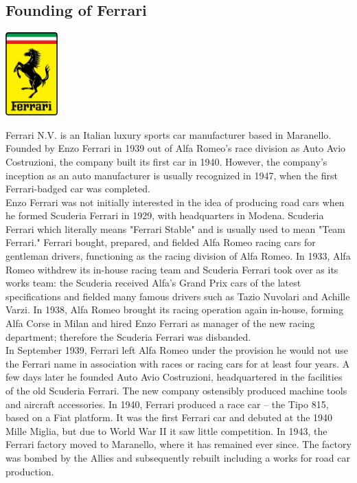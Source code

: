 \documentclass[11pt]{report}
\begin{document}
\subsection{Founding of Ferrari}
\vspace{2mm}\begin{center}\includegraphics[width=2cm]{./img/ferrariLogo.jpg}\end{center}
Ferrari N.V. is an Italian luxury sports car manufacturer based in Maranello. Founded by Enzo Ferrari in 1939 out of Alfa Romeo's race division as Auto Avio Costruzioni, the company built its first car in 1940. However, the company's inception as an auto manufacturer is usually recognized in 1947, when the first Ferrari-badged car was completed.\\ \indent Enzo Ferrari was not initially interested in the idea of producing road cars when he formed Scuderia Ferrari in 1929, with headquarters in Modena. Scuderia Ferrari which literally means "Ferrari Stable" and is usually used to mean "Team Ferrari." Ferrari bought, prepared, and fielded Alfa Romeo racing cars for gentleman drivers, functioning as the racing division of Alfa Romeo. In 1933, Alfa Romeo withdrew its in-house racing team and Scuderia Ferrari took over as its works team: the Scuderia received Alfa's Grand Prix cars of the latest specifications and fielded many famous drivers such as Tazio Nuvolari and Achille Varzi. In 1938, Alfa Romeo brought its racing operation again in-house, forming Alfa Corse in Milan and hired Enzo Ferrari as manager of the new racing department; therefore the Scuderia Ferrari was disbanded.\\
\indent In September 1939, Ferrari left Alfa Romeo under the provision he would not use the Ferrari name in association with races or racing cars for at least four years. A few days later he founded Auto Avio Costruzioni, headquartered in the facilities of the old Scuderia Ferrari. The new company ostensibly produced machine tools and aircraft accessories. In 1940, Ferrari produced a race car – the Tipo 815, based on a Fiat platform. It was the first Ferrari car and debuted at the 1940 Mille Miglia, but due to World War II it saw little competition. In 1943, the Ferrari factory moved to Maranello, where it has remained ever since. The factory was bombed by the Allies and subsequently rebuilt including a works for road car production.
\end{document}

